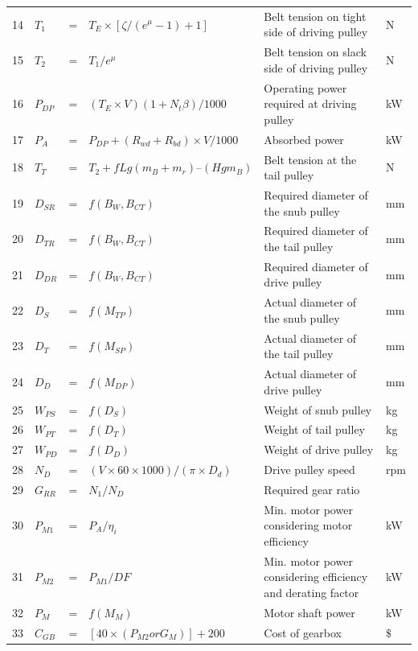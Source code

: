 \begin{table}[]
\begin{tabular}{ p{0.5cm} p{0.7cm} p{0.2cm} p{6cm} p{6.5cm} p{0.8cm} }
14	&	$T_{1}$ 	&	 = 	&	$T_{E}  \times  [{ \zeta /( e^\mu - 1)} + 1]$ 	&	 Belt tension on tight side of driving pulley 	&	 N\\
15	&	$T_{2}$ 	&	 = 	&	$T_{1} / e^ \mu$ 	&	 Belt tension on slack side of driving pulley 	&	 N\\
16	&	$P_{DP}$ 	&	 = 	&	$(T_{E}  \times  V)(1+N_{t} \beta) / 1000$ 	&	 Operating power required at driving pulley 	&	 kW\\
17	&	$P_{A}$ 	&	 = 	&	$P_{DP} + {(R_{wd} + R_{bd})  \times  V} / 1000$ 	&	 Absorbed power 	&	 kW\\
18	&	$T_{T}$ 	&	 = 	&	$T_{2} + { f   L    g    ( m_{B} + m_{r} )} – ( H   g    m_{B} )$ 	&	Belt tension at the tail pulley  	&	 N\\
19	&	$D_{SR}$ 	&	 = 	&	$f(B_{W}, B_{CT})$ 	&	Required diameter of the snub pulley	&	 mm\\
20	&	$D_{TR}$ 	&	 = 	&	$f(B_{W}, B_{CT})$ 	&	Required diameter of the tail pulley	&	 mm\\
21	&	$D_{DR}$ 	&	 = 	&	$f(B_{W}, B_{CT})$ 	&	Required diameter of drive pulley	&	 mm\\
22	&	$D_{S}$ 	&	 = 	&	$f(M_{TP})$ 	&	Actual diameter of the snub pulley 	&	 mm\\
23	&	$D_{T}$ 	&	 = 	&	$f(M_{SP})$ 	&	Actual diameter of the tail pulley 	&	 mm\\
24	&	$D_{D}$ 	&	 = 	&	$f(M_{DP})$ 	&	Actual diameter of drive pulley 	&	 mm\\
25	&	$W_{PS}$ 	&	 = 	&	$f(D_{S})$ 	&	Weight of snub pulley 	&	 kg\\
26	&	$W_{PT}$ 	&	 = 	&	$f(D_{T})$ 	&	Weight of tail pulley 	&	 kg\\
27	&	$W_{PD}$ 	&	 = 	&	$f(D_{D})$ 	&	Weight of drive pulley 	&	 kg\\
28	&	$N_{D}$ 	&	 = 	&	$(V  \times  60  \times 1000) / (\pi  \times  D_{d})$ 	&	Drive pulley speed 	&	 rpm\\
29	&	$G_{RR}$ 	&	 = 	&	$N_{1}/N_{D}$ 	&	Required gear ratio 	&	 \\
30	&	$P_{M1}$ 	&	 = 	&	$P_{A} / \eta_{i}$ 	&	Min. motor power considering motor efficiency 	&	 kW\\
31	&	$P_{M2}$ 	&	 = 	&	$P_{M1} / DF$ 	&	Min. motor power considering efficiency and derating factor 	&	 kW\\
32	&	$P_{M}$ 	&	 = 	&	$f(M_{M})$ 	&	Motor shaft power 	&	 kW\\
33	&	$C_{GB}$ 	&	 = 	&	$[40 \times (P_{M2} or G_{M})] + 200$ 	&	Cost of gearbox	&	$\$$\\

\end{tabular}
\end{table}
